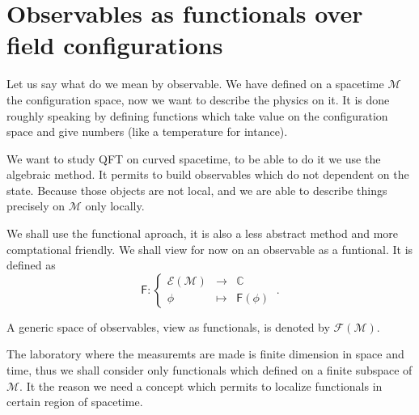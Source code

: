 \documentclass[12pt]{book}
\newcommand{\Ecal}{\mathcal{E}}
\newcommand{\Fcal}{\mathcal{F}}
\newcommand{\Mcal}{\mathcal{M}}
\newcommand{\Cbb}{\mathbb{C}}
\newcommand{\Fsf}{\mathsf{F}}
\theoremstyle{break}
\begin{document}

\section{Observables as functionals over field configurations}\label{p:OBS}


Let us say what do we mean by observable. We have defined on a spacetime $\Mcal$ the configuration space, now we want to describe the physics on it. It is done roughly speaking by defining functions which take value on the configuration space and give numbers (like a temperature for intance).




We want to study QFT on curved spacetime, to be able to do it we use the algebraic method. It permits to build observables which do not dependent on the state. Because those objects are not local, and we are able to describe things precisely on $\Mcal$ only locally.




We shall use the functional aproach, it is also a less abstract method and more comptational friendly. We shall view for now on an observable as a funtional. It is defined as 
%
\begin{equation*}
\Fsf : \left\{
\begin{array}{ccc}
\Ecal(\Mcal) & \to     & \Cbb \\
\phi  & \mapsto & \Fsf(\phi)
\end{array}
\right. \ . 
\end{equation*}

A generic space of observables, view as functionals, is denoted by $\Fcal(\Mcal)$.




The laboratory where the measuremts are made is finite dimension in space and time, thus we shall consider only functionals which defined on a finite subspace of $\Mcal$. It the reason we need a concept which permits to localize functionals in certain region of spacetime.
\end{document}
